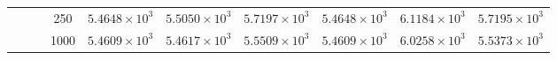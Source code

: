 \begin{table*}[t]
\begin{tabular}{|c||c|c||c|c|c||c|c|c|c|}
		\cline{4-10}
		& &
    &250 & \color{ao}$5.4648\times 10^3$ & $5.5050\times 10^3$ & $5.7197\times 10^3$ & \color{ao}$5.4648\times 10^3$ & $6.1184\times 10^3$ & $5.7195\times 10^3$  \\
		\cline{4-10}
		& &
    &1000 & \color{ao}$5.4609\times 10^3$ & $5.4617\times 10^3$ & $5.5509\times 10^3$ & \color{ao}$5.4609\times 10^3$ & $6.0258\times 10^3$ & $5.5373\times 10^3$  \\
		\hline
	\end{tabular}
\vspace{-0.75em}
\end{table*}	
